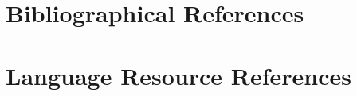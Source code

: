 \documentclass[10pt, a4paper]{article}
\begin{document}
\section{Bibliographical References}\label{reference}




\section{Language Resource References}
\label{lr:ref}
\end{document}
